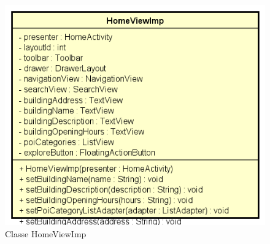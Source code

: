 \documentclass[../DefinizioneDiProdotto.tex]{subfiles}
\begin{document}
    \begin{figure}[H]
        \centering
        \includegraphics{img/HomeViewImp.png}
        \caption{Classe HomeViewImp}\label{fig:view::HomeViewImp} 
    \end{figure}
\end{document}

